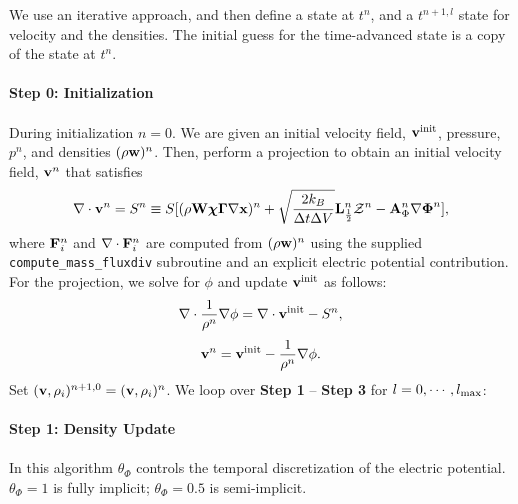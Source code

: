 \documentclass[final]{siamltex}
\def\Ab {{\bf A}}
\def\Fb {{\bf F}}
\def\Lb {{\bf L}}
\def\vb {{\bf v}}
\def\wb {{\bf w}}
\def\Wb {{\bf W}}
\def\xb {{\bf x}}
\def\chib   {\boldsymbol{\chi}}
\def\Gammab {\boldsymbol{\Gamma}}
\def\Phib   {\boldsymbol{\Phi}}
\def\half   {\frac{1}{2}}
\begin{document}
We use an iterative approach, and then define a state at $t^n$, and
a $t^{n+1,l}$ state for velocity and the densities.  The initial guess for
the time-advanced state is a copy of the state at $t^n$.\\ \\
{\bf Step 0: Initialization}\\ \\
During initialization $n=0$.
We are given an initial velocity field, $\vb^{\rm init}$, pressure, $p^n$,
and densities $(\rho\wb)^n$.
Then, perform a projection to obtain an initial velocity field, $\vb^n$ that satisfies
\begin{equation}
\nabla\cdot\vb^n = S^n \equiv 
S[(\rho\Wb\chib\Gammab\nabla\xb)^n + \sqrt{\frac{2k_B}{\Delta t\Delta V}}\Lb_\half^n\mathcal{Z}^n - \Ab_\Phi^n\nabla\Phib^n],
\end{equation}
where $\Fb_i^n$ and $\nabla\cdot\Fb_i^n$ are computed from $(\rho\wb)^n$ using the 
supplied {\tt compute\_mass\_fluxdiv} subroutine and an explicit electric
potential contribution.
For the projection, we solve for $\phi$ and update $\vb^{\rm init}$ as follows:
\begin{equation}
\nabla\cdot\frac{1}{\rho^n}\nabla\phi = \nabla\cdot\vb^{\rm init} - S^n,
\end{equation}
\begin{equation}
\vb^n = \vb^{\rm init} - \frac{1}{\rho^n}\nabla\phi.
\end{equation}
Set $(\vb,\rho_i)^{n+1,0} = (\vb,\rho_i)^n$.
We loop over {\bf Step 1} -- {\bf Step 3} for $l=0,\cdots,l_{\rm max}$:\\ \\
{\bf Step 1: Density Update}\\ \\
In this algorithm $\theta_\Phi$ controls
the temporal discretization of the electric potential.  $\theta_\Phi=1$ is fully
implicit; $\theta_\Phi=0.5$ is semi-implicit.\\ \\
\end{document}
